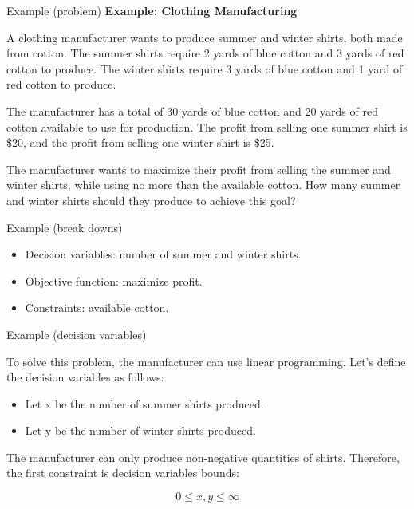\documentclass{beamer}
\begin{document}
\begin{frame}{Example (problem)}
    \textbf{Example: Clothing Manufacturing}

    A clothing manufacturer wants to produce summer and winter shirts, both made from cotton. The summer shirts require 2 yards of blue cotton and 3 yards of red cotton to produce. The winter shirts require 3 yards of blue cotton and 1 yard of red cotton to produce.

    The manufacturer has a total of 30 yards of blue cotton and 20 yards of red cotton available to use for production. The profit from selling one summer shirt is \$20, and the profit from selling one winter shirt is \$25.

    The manufacturer wants to maximize their profit from selling the summer and winter shirts, while using no more than the available cotton. How many summer and winter shirts should they produce to achieve this goal?
\end{frame}

\begin{frame}{Example (break downs)}

    \begin{itemize}
        \item Decision variables: number of summer and winter shirts.
        \item Objective function: maximize profit.
        \item Constraints: available cotton.
    \end{itemize}

\end{frame}

\begin{frame}{Example (decision variables)}

    To solve this problem, the manufacturer can use linear programming. Let's define the decision variables as follows:
    \begin{itemize}
        \item Let x be the number of summer shirts produced.
        \item Let y be the number of winter shirts produced.
    \end{itemize}

    The manufacturer can only produce non-negative quantities of shirts. Therefore, the first constraint is decision variables bounds:

    \begin{equation}
        0 \leq x, y \leq \infty
    \end{equation}

\end{frame}
\end{document}
